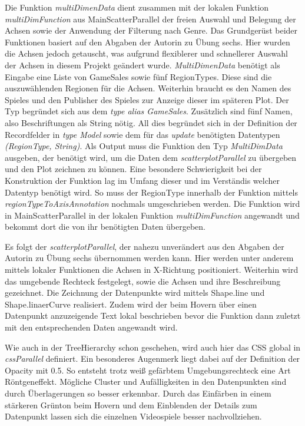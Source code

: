 \documentclass[usegeometry=true]{scrartcl}
\begin{document}
Die Funktion \textit{multiDimenData} dient zusammen mit der lokalen Funktion \textit{multiDimFunction} aus MainScatterParallel der freien Auswahl und Belegung der Achsen sowie der Anwendung der Filterung nach Genre. 
Das Grundgerüst beider Funktionen basiert auf den Abgaben der Autorin zu Übung sechs. 
Hier wurden die Achsen jedoch getauscht, was aufgrund flexiblerer und schnellerer Auswahl der Achsen in diesem Projekt geändert wurde. 
\textit{MultiDimenData} benötigt als Eingabe eine Liste von GameSales sowie fünf RegionTypes. Diese sind die auszuwählenden Regionen für die Achsen. 
Weiterhin braucht es den Namen des Spieles und den Publisher des Spieles zur Anzeige dieser im späteren Plot. Der Typ begründet sich aus dem \textit{type alias GameSales}.
Zusätzlich sind fünf Namen, also Beschriftungen als String nötig. 
All dies begründet sich in der Definition der Recordfelder in \textit{type Model} sowie dem für das \textit{update} benötigten Datentypen \textit{(RegionType, String)}.
Als Output muss die Funktion den Typ \textit{MultiDimData} ausgeben, der benötigt wird, um die Daten dem \textit{scatterplotParallel} zu übergeben und den Plot zeichnen zu können.
Eine besondere Schwierigkeit bei der Konstruktion der Funktion lag im Umfang dieser und im Verständis welcher Datentyp benötigt wird. 
So muss der RegionType innerhalb der Funktion mittels \textit{regionTypeToAxisAnnotation} nochmals umgeschrieben werden. 
Die Funktion wird in MainScatterParallel in der lokalen Funktion \textit{multiDimFunction} angewandt und bekommt dort die von ihr benötigten Daten übergeben.

Es folgt der \textit{scatterplotParallel}, der nahezu unverändert aus den Abgaben der Autorin zu Übung sechs übernommen werden kann. 
Hier werden unter anderem mittels lokaler Funktionen die Achsen in X-Richtung positioniert. 
Weiterhin wird das umgebende Rechteck festgelegt, sowie die Achsen und ihre Beschreibung gezeichnet. Die Zeichnung der Datenpunkte wird mittels Shape.line und Shape.linaerCurve realisiert.
Zudem wird der beim Hovern über einen Datenpunkt anzuzeigende Text lokal beschrieben bevor die Funktion dann zuletzt mit den entsprechenden Daten angewandt wird.

Wie auch in der TreeHierarchy schon geschehen, wird auch hier das CSS global in \textit{cssParallel} definiert. Ein besonderes Augenmerk liegt dabei auf der Definition der Opacity mit 0.5. 
So entsteht trotz weiß gefärbtem Umgebungsrechteck eine Art Röntgeneffekt. Mögliche Cluster und Aufälligkeiten in den Datenpunkten sind durch Überlagerungen so besser erkennbar.
Durch das Einfärben in einem stärkeren Grünton beim Hovern und dem Einblenden der Details zum Datenpunkt lassen sich die einzelnen Videospiele besser nachvollziehen.
\end{document}

